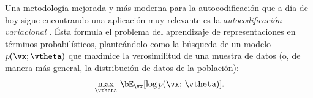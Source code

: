 \documentclass[../../book-main_es.tex]{subfiles}
\begin{document}
Una metodología mejorada y más moderna para la autocodificación que a día de hoy sigue encontrando 
una aplicación muy relevante es la \textit{autocodificación variacional}
\cite{Kingma2013-sb,Kingma2019-zh}.
%
Ésta formula el problema del aprendizaje de representaciones en términos probabilísticos, planteándolo como la
búsqueda de un modelo $p(\vx; \vtheta)$
que maximice la verosimilitud de una muestra de datos (o, de manera más general, la
distribución de datos de la población):
\begin{equation*}
    \max_{\vtheta}\, \bE_{\vx}[ \log p(\vx;\, \vtheta) ].
\end{equation*}
\end{document}
